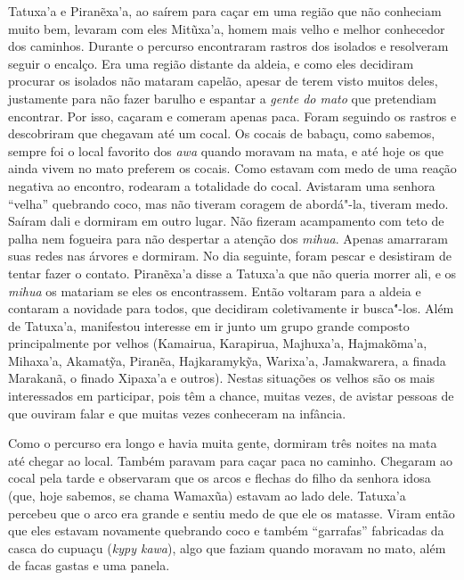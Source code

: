 Tatuxa'a e Piranẽxa'a, ao saírem para caçar em uma região que não
conheciam muito bem, levaram com eles Mitũxa'a, homem mais velho e
melhor conhecedor dos caminhos. Durante o percurso encontraram rastros
dos isolados e resolveram seguir o encalço. Era uma região distante da
aldeia, e como eles decidiram procurar os isolados não mataram capelão,
apesar de terem visto muitos deles, justamente para não fazer barulho e
espantar a \emph{gente do mato} que pretendiam encontrar. Por isso,
caçaram e comeram apenas paca. Foram seguindo os rastros e descobriram
que chegavam até um cocal. Os cocais de babaçu, como sabemos, sempre foi
o local favorito dos \emph{awa} quando moravam na mata, e até hoje os
que ainda vivem no mato preferem os cocais. Como estavam com medo de uma
reação negativa ao encontro, rodearam a totalidade do cocal. Avistaram
uma senhora ``velha'' quebrando coco, mas não tiveram coragem de
abordá"-la, tiveram medo. Saíram dali e dormiram em outro lugar. Não
fizeram acampamento com teto de palha nem fogueira para não despertar a
atenção dos \emph{mihua}. Apenas amarraram suas redes nas árvores e
dormiram. No dia seguinte, foram pescar e desistiram de tentar fazer o
contato. Piranẽxa'a disse a Tatuxa'a que não queria morrer ali, e os
\emph{mihua} os matariam se eles os encontrassem. Então voltaram para a
aldeia e contaram a novidade para todos, que decidiram coletivamente ir
busca"́-los. Além de Tatuxa'a, manifestou interesse em ir junto um grupo
grande composto principalmente por velhos (Kamairua, Karapirua,
Majhuxa'a, Hajmakõma'a, Mihaxa'a, Akamatỹa, Piranẽa, Hajkaramykỹa,
Warixa'a, Jamakwarera, a finada Marakanã, o finado Xipaxa'a e outros).
Nestas situações os velhos são os mais interessados em participar, pois
têm a chance, muitas vezes, de avistar pessoas de que ouviram falar e
que muitas vezes conheceram na infância.

Como o percurso era longo e havia muita gente, dormiram três noites na
mata até chegar ao local. Também paravam para caçar paca no caminho.
Chegaram ao cocal pela tarde e observaram que os arcos e flechas do
filho da senhora idosa (que, hoje sabemos, se chama Wamaxũa) estavam ao
lado dele. Tatuxa'a percebeu que o arco era grande e sentiu medo de que
ele os matasse. Viram então que eles estavam novamente quebrando coco e
também ``garrafas'' fabricadas da casca do cupuaçu (\emph{kypy kawa}),
algo que faziam quando moravam no mato, além de facas gastas e uma
panela.

